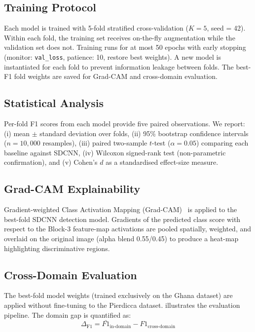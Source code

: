 \documentclass[5p,times,twocolumn]{elsarticle}
\begin{document}
\subsection{Training Protocol}
\label{sec:training}

Each model is trained with 5-fold stratified cross-validation
($K=5$, seed = 42).
Within each fold, the training set receives on-the-fly augmentation while
the validation set does not.
Training runs for at most 50 epochs with early stopping
(monitor: \texttt{val\_loss}, patience: 10, restore best weights).
A new model is instantiated for each fold to prevent information leakage
between folds.
The best-F1 fold weights are saved for Grad-CAM and cross-domain evaluation.

\subsection{Statistical Analysis}
\label{sec:stats}

Per-fold F1 scores from each model provide five paired observations.
We report:
(i) mean $\pm$ standard deviation over folds,
(ii) 95\% bootstrap confidence intervals ($n=10{,}000$ resamples),
(iii) paired two-sample $t$-test ($\alpha=0.05$) comparing each baseline
     against SDCNN,
(iv) Wilcoxon signed-rank test (non-parametric confirmation), and
(v) Cohen's $d$ as a standardised effect-size measure.

\subsection{Grad-CAM Explainability}
\label{sec:gradcam}

Gradient-weighted Class Activation Mapping
(Grad-CAM)~\cite{selvaraju2017} is applied to the best-fold SDCNN
detection model.
Gradients of the predicted class score with respect to the Block-3
feature-map activations are pooled spatially, weighted, and overlaid on the
original image (alpha blend 0.55/0.45) to produce a heat-map highlighting
discriminative regions.

\subsection{Cross-Domain Evaluation}
\label{sec:cross_domain}

The best-fold model weights (trained exclusively on the Ghana dataset)
are applied without fine-tuning to the Pierdicca dataset.
 illustrates the evaluation pipeline.
The domain gap is quantified as:
\[
  \Delta_{\text{F1}} = \bar{F1}_{\text{in-domain}} - F1_{\text{cross-domain}}
\]
\end{document}
